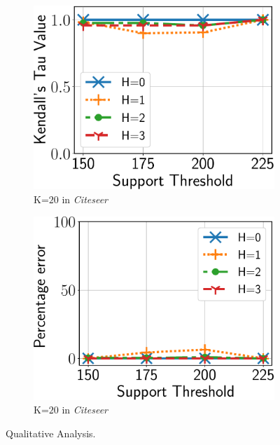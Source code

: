 \begin{figure}
\begin{subfigure}[b]{0.25\textwidth}
		\includegraphics[keepaspectratio,scale=0.24, angle=0]{img2/citeseer/citeseer_kt.pdf}
		\caption{\scriptsize {\sf K}=$20$ in {\em Citeseer}}
	\end{subfigure}%
	\begin{subfigure}[b]{0.25\textwidth}
		\includegraphics[keepaspectratio,scale=0.24, angle=0]{img2/citeseer/citeseer_spread.pdf}
		\caption{\scriptsize {\sf K}=$20$ in {\em Citeseer}}
		\label{fig:citeseer_error}
	\end{subfigure}
	\vspace{-2mm}
	\caption{\scriptsize Qualitative Analysis.}
	\label{fig:quality}
	\vspace{-2mm}
\end{figure}








